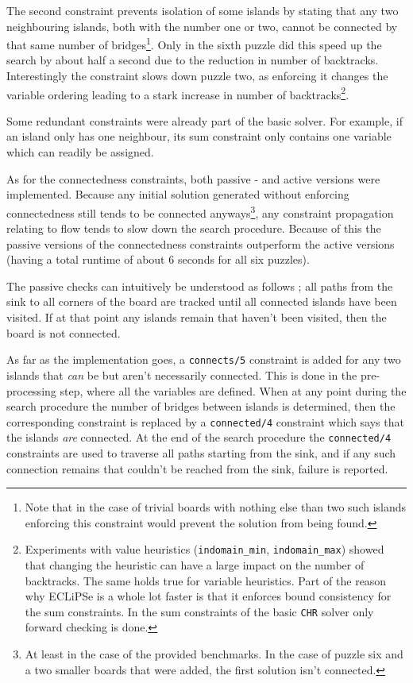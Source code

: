 The second constraint prevents isolation of some islands by stating that any two neighbouring islands, both with the number one or two, cannot be connected by that same number of bridges\footnote{Note that in the case of trivial boards with nothing else than two such islands enforcing this constraint would prevent the solution from being found.}. Only in the sixth puzzle did this speed up the search by about half a second due to the reduction in number of backtracks. Interestingly the constraint slows down puzzle two, as enforcing it changes the variable ordering leading to a stark increase in number of backtracks\footnote{Experiments with value heuristics (\texttt{indomain\_min}, \texttt{indomain\_max}) showed that changing the heuristic can have a large impact on the number of backtracks. The same holds true for variable heuristics. Part of the reason why ECLiPSe is a whole lot faster is that it enforces bound consistency for the sum constraints. In the sum constraints of the basic \texttt{CHR} solver only forward checking is done.}.\\\par

Some redundant constraints were already part of the basic solver. For example, if an island only has one neighbour, its sum constraint only contains one variable which can readily be assigned.\\\par

As for the connectedness constraints, both passive - and active versions were implemented. Because any initial solution generated without enforcing connectedness still tends to be connected anyways\footnote{At least in the case of the provided benchmarks. In the case of puzzle six and a two smaller boards that were added, the first solution isn't connected.}, any constraint propagation relating to flow tends to slow down the search procedure. Because of this the passive versions of the connectedness constraints outperform the active versions (having a total runtime of about 6 seconds for all six puzzles).\\\par

The passive checks can intuitively be understood as follows ; all paths from the sink to all corners of the board are tracked until all connected islands have been visited. If at that point any islands remain that haven't been visited, then the board is not connected.\par
As far as the implementation goes, a \texttt{connects/5} constraint is added for any two islands that \textit{can} be but aren't necessarily connected. This is done in the pre-processing step, where all the variables are defined. When at any point during the search procedure the number of bridges between islands is determined, then the corresponding constraint is replaced by a \texttt{connected/4} constraint which says that the islands \textit{are} connected. At the end of the search procedure the \texttt{connected/4} constraints are used to traverse all paths starting from the sink, and if any such connection remains that couldn't be reached from the sink, failure is reported.\\\par

